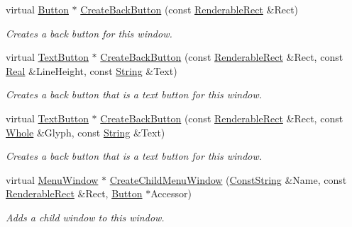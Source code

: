 \begin{DoxyCompactItemize}
virtual \hyperlink{classMezzanine_1_1UI_1_1Button}{Button} $\ast$ \hyperlink{classMezzanine_1_1UI_1_1MenuWindow_ac03348abfea097331902ca8d34180138}{CreateBackButton} (const \hyperlink{structMezzanine_1_1UI_1_1RenderableRect}{RenderableRect} \&Rect)
\begin{DoxyCompactList}\small\item\em Creates a back button for this window. \item\end{DoxyCompactList}\item 
virtual \hyperlink{classMezzanine_1_1UI_1_1TextButton}{TextButton} $\ast$ \hyperlink{classMezzanine_1_1UI_1_1MenuWindow_aa47aabf83f375c872a3c4bbec473fc49}{CreateBackButton} (const \hyperlink{structMezzanine_1_1UI_1_1RenderableRect}{RenderableRect} \&Rect, const \hyperlink{namespaceMezzanine_a726731b1a7df72bf3583e4a97282c6f6}{Real} \&LineHeight, const \hyperlink{namespaceMezzanine_acf9fcc130e6ebf08e3d8491aebcf1c86}{String} \&Text)
\begin{DoxyCompactList}\small\item\em Creates a back button that is a text button for this window. \item\end{DoxyCompactList}\item 
virtual \hyperlink{classMezzanine_1_1UI_1_1TextButton}{TextButton} $\ast$ \hyperlink{classMezzanine_1_1UI_1_1MenuWindow_acda1808f25bde401d422367cebb8fda9}{CreateBackButton} (const \hyperlink{structMezzanine_1_1UI_1_1RenderableRect}{RenderableRect} \&Rect, const \hyperlink{namespaceMezzanine_adcbb6ce6d1eb4379d109e51171e2e493}{Whole} \&Glyph, const \hyperlink{namespaceMezzanine_acf9fcc130e6ebf08e3d8491aebcf1c86}{String} \&Text)
\begin{DoxyCompactList}\small\item\em Creates a back button that is a text button for this window. \item\end{DoxyCompactList}\item 
virtual \hyperlink{classMezzanine_1_1UI_1_1MenuWindow}{MenuWindow} $\ast$ \hyperlink{classMezzanine_1_1UI_1_1MenuWindow_ad4159f0de7e84d177e326c37fadd4a9c}{CreateChildMenuWindow} (\hyperlink{namespaceMezzanine_a63cd699ac54b73953f35ec9cfc05e506}{ConstString} \&Name, const \hyperlink{structMezzanine_1_1UI_1_1RenderableRect}{RenderableRect} \&Rect, \hyperlink{classMezzanine_1_1UI_1_1Button}{Button} $\ast$Accessor)
\begin{DoxyCompactList}\small\item\em Adds a child window to this window. \item\end{DoxyCompactList}\item 

\end{DoxyCompactItemize}
